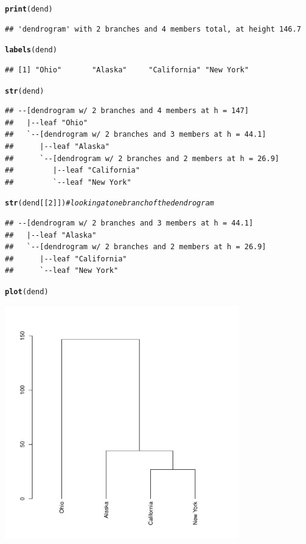 \documentclass[shortnames,nojss,article]{jss}\usepackage[]{graphicx}\usepackage[]{color}
\makeatletter
\newcommand{\hlnum}[1]{\textcolor[rgb]{0.686,0.059,0.569}{#1}}%
\newcommand{\hlcom}[1]{\textcolor[rgb]{0.678,0.584,0.686}{\textit{#1}}}%
\newcommand{\hlstd}[1]{\textcolor[rgb]{0.345,0.345,0.345}{#1}}%
\newcommand{\hlkwd}[1]{\textcolor[rgb]{0.737,0.353,0.396}{\textbf{#1}}}%
\newenvironment{kframe}{%
 \def\at@end@of@kframe{}%
 \ifinner\ifhmode%
  \def\at@end@of@kframe{\end{minipage}}%
  \begin{minipage}{\columnwidth}%
 \fi\fi%
 \def\FrameCommand##1{\hskip\@totalleftmargin \hskip-\fboxsep
 \colorbox{shadecolor}{##1}\hskip-\fboxsep
     \hskip-\linewidth \hskip-\@totalleftmargin \hskip\columnwidth}%
 \MakeFramed {\advance\hsize-\width
   \@totalleftmargin\z@ \linewidth\hsize
   \@setminipage}}%
 {\par\unskip\endMakeFramed%
 \at@end@of@kframe}
\newenvironment{knitrout}{}{} %
\makeatother
\begin{document}
\begin{knitrout}
\color{fgcolor}\begin{kframe}
\begin{alltt}
\hlkwd{print}\hlstd{(dend)}
\end{alltt}
\begin{verbatim}
## 'dendrogram' with 2 branches and 4 members total, at height 146.7
\end{verbatim}
\begin{alltt}
\hlkwd{labels}\hlstd{(dend)}
\end{alltt}
\begin{verbatim}
## [1] "Ohio"       "Alaska"     "California" "New York"
\end{verbatim}
\begin{alltt}
\hlkwd{str}\hlstd{(dend)}
\end{alltt}
\begin{verbatim}
## --[dendrogram w/ 2 branches and 4 members at h = 147]
##   |--leaf "Ohio" 
##   `--[dendrogram w/ 2 branches and 3 members at h = 44.1]
##      |--leaf "Alaska" 
##      `--[dendrogram w/ 2 branches and 2 members at h = 26.9]
##         |--leaf "California" 
##         `--leaf "New York"
\end{verbatim}
\begin{alltt}
\hlkwd{str}\hlstd{(dend[[}\hlnum{2}\hlstd{]])}  \hlcom{# looking at one branch of the dendrogram}
\end{alltt}
\begin{verbatim}
## --[dendrogram w/ 2 branches and 3 members at h = 44.1]
##   |--leaf "Alaska" 
##   `--[dendrogram w/ 2 branches and 2 members at h = 26.9]
##      |--leaf "California" 
##      `--leaf "New York"
\end{verbatim}
\begin{alltt}
\hlkwd{plot}\hlstd{(dend)}
\end{alltt}
\end{kframe}

{\centering \includegraphics[width=4in,height=4in]{figure/unnamed-chunk-4} 

}



\end{knitrout}
\end{document}
